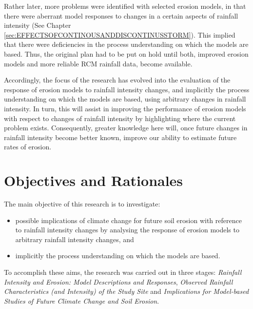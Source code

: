 Rather later, more problems were identified with selected erosion models, in
that there were aberrant model responses to changes in a certain aspects of
rainfall intensity (See Chapter
\ref{sec:EFFECTSOFCONTINOUSANDDISCONTINUSSTORM}). This implied that there were
deficiencies in the process understanding on which the models are based. Thus,
the original plan had to be put on hold until both, improved erosion models and
more reliable RCM rainfall data, become available.

Accordingly, the focus of the research has evolved into the evaluation of the
response of erosion models to rainfall intensity changes, and implicitly the
process understanding on which the models are based, using arbitrary changes in
rainfall intensity. In turn, this will assist in improving the performance of
erosion models with respect to changes of rainfall intensity by highlighting
where the current problem exists. Consequently, greater knowledge here will,
once future changes in rainfall intensity become better known, improve our
ability to estimate future rates of erosion.

\section{Objectives and Rationales}
\label{sec:ResearchObjectives}

The main objective of this research is to investigate:
\begin{itemize}
 \item possible implications of climate change for future soil erosion with
reference to rainfall intensity changes by analysing the response of erosion
models to arbitrary rainfall intensity changes, and
 \item implicitly the process understanding on which the models are based.
\end{itemize}
To accomplish these aims, the research was carried out in three stages:
\textit{Rainfall Intensity and Erosion: Model Descriptions and
Responses},\textit{ Observed Rainfall Characteristics (and Intensity) of the
Study Site} and \textit{Implications for Model-based Studies of Future Climate
Change and Soil Erosion}.

